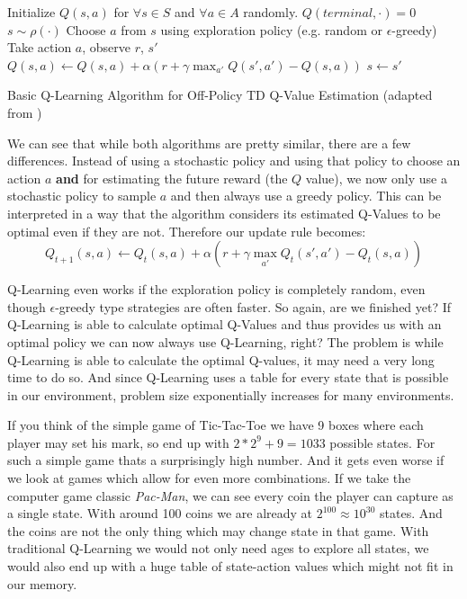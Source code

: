 \begin{algorithm}[ht]
  Initialize $Q(s, a)$ for $\forall s \in S$ and $\forall a \in A$ randomly. $Q(terminal, \cdot) = 0$ \;
   {
   $s \sim \rho(\cdot)$ \;
     {
    Choose $a$ from $s$ using exploration policy (e.g. random or $\epsilon$-greedy) \;
     Take action $a$, observe $r$, $s'$ \;
     $Q(s, a) \leftarrow Q(s, a) + \alpha (r + \gamma\max_{a'} Q(s', a') - Q(s, a))$ \;
     $s \leftarrow s'$\;
   }
 }
  \caption[The Q-Learning Algorithm]{Basic Q-Learning Algorithm for Off-Policy TD Q-Value Estimation (adapted from \cite{sutton2018reinforcement})}\label{alg:QLearning}
 \end{algorithm}

We can see that while both algorithms are pretty similar, there are a few differences. Instead of using a stochastic policy and using that policy to choose an action $a$ \textbf{and} for estimating the future reward (the $Q$ value), we now only use a stochastic policy to sample $a$ and then always use a greedy policy. This can be interpreted in a way that the algorithm considers its estimated Q-Values to be optimal even if they are not. Therefore our update rule becomes: 
\[Q_{t+1}(s, a) \leftarrow Q_t(s, a) + \alpha (r + \gamma\max_{a'} Q_t(s', a') - Q_t(s, a))\]

Q-Learning even works if the exploration policy is completely random, even though $\epsilon$-greedy type strategies are often faster. So again, are we finished yet? If Q-Learning is able to calculate optimal Q-Values and thus provides us with an optimal policy we can now always use Q-Learning, right? The problem is while Q-Learning is able to calculate the optimal Q-values, it may need a very long time to do so. And since Q-Learning uses a table for every state that is possible in our environment, problem size exponentially increases for many environments.

If you think of the simple game of Tic-Tac-Toe we have 9 boxes where each player may set his mark, so end up with $2*2^9+9=1033$ possible states. For such a simple game thats a surprisingly high number. And it gets even worse if we look at games which allow for even more combinations. If we take the computer game classic \textit{Pac-Man}, we can see every coin the player can capture as a single state. With around 100 coins we are already at $2^{100} \approx 10^{30}$ states. And the coins are not the only thing which may change state in that game. With traditional Q-Learning we would not only need ages to explore all states, we would also end up with a huge table of state-action values which might not fit in our memory.

